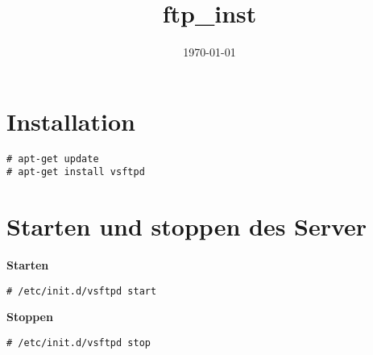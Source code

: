 \documentclass[11pt]{article}
\date{\today}
\title{ftp\_inst}
\begin{document}
\maketitle
\tableofcontents


\section{Installation}
\label{sec-1}
\begin{verbatim}
# apt-get update
# apt-get install vsftpd
\end{verbatim}

\section{Starten und stoppen des Server}
\label{sec-2}
\textbf{Starten}
\begin{verbatim}
# /etc/init.d/vsftpd start
\end{verbatim}
\textbf{Stoppen}
\begin{verbatim}
# /etc/init.d/vsftpd stop
\end{verbatim}
\end{document}
